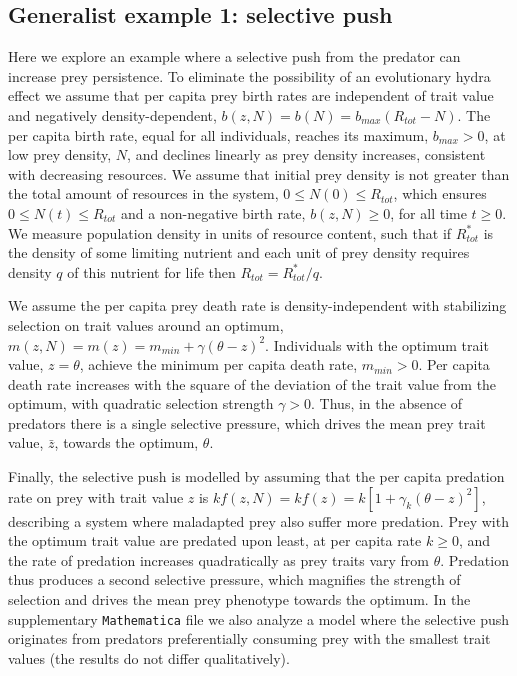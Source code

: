 \documentclass[11pt]{article}
\begin{document}
\subsection*{Generalist example 1: selective push}

Here we explore an example where a selective push from the predator can increase prey persistence.
To eliminate the possibility of an evolutionary hydra effect we assume that per capita prey birth rates are independent of trait value and negatively density-dependent, $b(z,N) = b(N) = b_{max} (R_{tot} - N)$.
The per capita birth rate, equal for all individuals, reaches its maximum, $b_{max}>0$, at low prey density, $N$, and declines linearly as prey density increases, consistent with decreasing resources.
We assume that initial prey density is not greater than the total amount of resources in the system, $0 \leq N(0) \leq R_{tot}$, which ensures $0 \leq N(t)\leq R_{tot}$ and a non-negative birth rate, $b(z,N)\geq0$, for all time $t\geq0$.
We measure population density in units of resource content, such that if $R^*_{tot}$ is the density of some limiting nutrient and each unit of prey density requires density $q$ of this nutrient for life then $R_{tot} = R^*_{tot}/q$.

We assume the per capita prey death rate is density-independent with stabilizing selection on trait values around an optimum, $m(z,N) = m(z) = m_{min} + \gamma (\theta - z)^2$.
Individuals with the optimum trait value, $z = \theta$,  achieve the minimum per capita death rate, $m_{min}>0$.
Per capita death rate increases with the square of the deviation of the trait value from the optimum, with quadratic selection strength $\gamma>0$.
Thus, in the absence of predators there is a single selective pressure, which drives the mean prey trait value, $\bar{z}$, towards the optimum, $\theta$. 

Finally, the selective push is modelled by assuming that the per capita predation rate on prey with trait value $z$ is $k f(z,N) = k f(z) = k \left[1 + \gamma_k (\theta - z)^2 \right]$, describing a system where maladapted prey also suffer more predation.
Prey with the optimum trait value are predated upon least, at per capita rate $k\geq0$, and the rate of predation increases quadratically as prey traits vary from $\theta$.
Predation thus produces a second selective pressure, which magnifies the strength of selection and drives the mean prey phenotype towards the optimum.
In the supplementary \texttt{Mathematica} file we also analyze a model where the selective push originates from predators preferentially consuming prey with the smallest trait values (the results do not differ qualitatively). 
\end{document}
